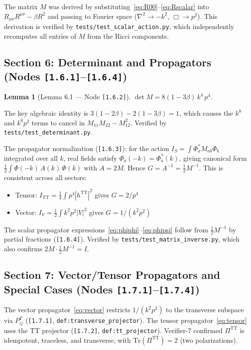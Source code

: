 \documentclass[11pt,a4paper]{article}
\newtheorem{lemma}[theorem]{Lemma}
\newcommand{\lap}{\nabla^2}
\newcommand{\dbox}{\Box}
\newcommand{\TT}{\mathrm{TT}}
\newcommand{\afnode}[1]{\texttt{[#1]}}
\newcommand{\aftest}[1]{\texttt{tests/#1}}
\newcommand{\afdef}[1]{\texttt{def:#1}}
\begin{document}
The matrix $M$ was derived by substituting~\eqref{eq:R00}--\eqref{eq:Rscalar}
into $R_{\mu\nu}R^{\mu\nu} - \beta R^2$ and passing to Fourier space
($\lap \to -k^2$, $\dbox \to p^2$). This derivation is verified by
\aftest{test\_scalar\_action.py}, which independently recomputes all entries
of $M$ from the Ricci components.

\subsection{Section 6: Determinant and Propagators (Nodes \afnode{1.6.1}--\afnode{1.6.4})}

\begin{lemma}[Lemma 6.1 --- Node \afnode{1.6.2}]
$\det M = 8(1-3\beta)\,k^4\,p^4$.
\end{lemma}

The key algebraic identity is $3(1-2\beta) - 2(1-3\beta) = 1$, which causes the
$k^8$ and $k^6 p^2$ terms to cancel in $M_{11}M_{22} - M_{12}^2$.
Verified by \aftest{test\_determinant.py}.

The propagator normalization (\afnode{1.6.3}): for the action
$I_S = \int \Phi^*_a M_{ab} \Phi_b$ integrated over all $k$, real fields satisfy
$\Phi_a(-k) = \Phi^*_a(k)$, giving canonical form $\tfrac{1}{2}\int \Phi(-k)\,A(k)\,\Phi(k)$
with $A = 2M$. Hence $G = A^{-1} = \tfrac{1}{2}M^{-1}$.
This is consistent across all sectors:
\begin{itemize}
\item Tensor: $I_{\TT} = \tfrac{1}{4}\int p^4|h^{\TT}|^2$ gives $G = 2/p^4$ \checkmark
\item Vector: $I_V = \tfrac{1}{2}\int k^2p^2|V|^2$ gives $G = 1/(k^2p^2)$ \checkmark
\end{itemize}

The scalar propagator expressions~\eqref{eq:phiphi}--\eqref{eq:phipsi}
follow from $\tfrac{1}{2}M^{-1}$ by partial fractions (\afnode{1.6.4}).
Verified by \aftest{test\_matrix\_inverse.py}, which also confirms
$2M \cdot \tfrac{1}{2}M^{-1} = I$.

\subsection{Section 7: Vector/Tensor Propagators and Special Cases (Nodes \afnode{1.7.1}--\afnode{1.7.4})}

The vector propagator~\eqref{eq:vector} restricts $1/(k^2p^2)$ to the transverse
subspace via $P^T_{ij}$ (\afnode{1.7.1}, \afdef{transverse\_projector}).
The tensor propagator~\eqref{eq:tensor} uses the TT projector
(\afnode{1.7.2}, \afdef{tt\_projector}).
Verifier-7 confirmed $\Pi^{\TT}$ is idempotent, traceless, and transverse,
with $\mathrm{Tr}(\Pi^{\TT}) = 2$ (two polarizations).
\end{document}
